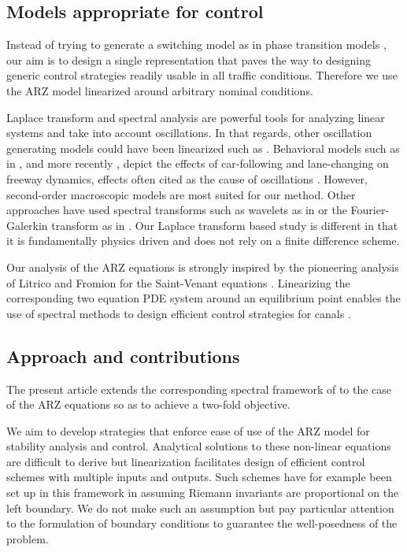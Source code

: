 \documentclass[5p,twocolumn]{elsarticle}
\begin{document}
\subsection{Models appropriate for control}
Instead of trying to generate a switching model as in phase transition models \cite{colombo2003hyperbolic, treiber2010three, blandin2011general}, our aim is to design a single representation that paves the way to designing generic control strategies readily usable in all traffic conditions. Therefore we use the ARZ model linearized around arbitrary nominal conditions. 

Laplace transform and spectral analysis are powerful tools for analyzing linear systems and take into account oscillations. In that regards, other oscillation generating models could have been linearized such as \cite{Greenberg_congestionredux}. Behavioral models such as in \cite{Newell, treiber2000congested}, and more recently \cite{Chen2012, Ge20129}, depict the effects of car-following and lane-changing on freeway dynamics, effects often cited as the cause of oscillations \cite{Mauch02freewaytraffic, lanechangin2005,lanechanging2007}. However, second-order macroscopic models are most suited for our method. Other approaches have used spectral transforms such as wavelets as in \cite{Zheng2011} or the Fourier-Galerkin transform as in \cite{fourierGalerkin}. Our Laplace transform based study is different in that it is fundamentally physics driven and does not rely on a finite difference scheme.

Our analysis of the ARZ equations is strongly inspired by the pioneering analysis of Litrico and Fromion for the Saint-Venant equations \cite{litrico2009modeling}. Linearizing the corresponding two equation PDE system around an equilibrium point enables the use of spectral methods to design efficient control strategies for canals \cite{Litricoapplic}.

\subsection{Approach and contributions}
The present article extends the corresponding spectral framework of \cite{litrico2009modeling} to the case of the ARZ equations so as to achieve a two-fold objective.

We aim to develop strategies that enforce ease of use of the ARZ model for stability analysis and control. Analytical solutions to these non-linear equations are difficult to derive but linearization facilitates design of efficient control schemes with multiple inputs and outputs. Such schemes have for example been set up in this framework in \cite{lamare2014} assuming Riemann invariants are proportional on the left boundary. We do not make such an assumption but pay particular attention to the formulation of boundary conditions to guarantee the well-posedness of the problem.
\end{document}
